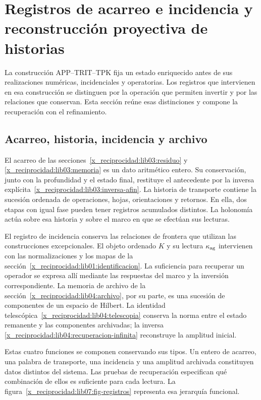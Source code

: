 \chapter{Registros de acarreo e incidencia y reconstrucción proyectiva de historias}
\label{x_reciprocidad:lib07:armonizacion}
La construcción APP--TRIT--TPK fija un estado enriquecido antes de
sus realizaciones numéricas, incidenciales y operatorias. Los registros
que intervienen en esa construcción se distinguen por la operación
que permiten invertir y por las relaciones que conservan. Esta sección
reúne esas distinciones y compone la recuperación con el refinamiento.

\section{Acarreo, historia, incidencia y archivo}
El acarreo de las secciones~\ref{x_reciprocidad:lib03:residuo} y
\ref{x_reciprocidad:lib03:memoria} es un dato aritmético entero. Su conservación,
junto con la profundidad y el estado final, restituye el antecedente
por la inversa explícita~\eqref{x_reciprocidad:lib03:inversa-afin}.
La historia de transporte contiene la sucesión ordenada de operaciones,
hojas, orientaciones y retornos. En ella, dos etapas con igual fase
pueden tener registros acumulados distintos. La holonomía actúa sobre
esa historia y sobre el marco en que se efectúan sus lecturas.

El registro de incidencia conserva las relaciones de frontera que
utilizan las construcciones excepcionales. El objeto ordenado \(K\)
y su lectura \(\kappa_{\rm ag}\) intervienen con las normalizaciones
y los mapas de la sección~\ref{x_reciprocidad:lib01:identificacion}.
La suficiencia para recuperar un operador se expresa allí mediante
las respuestas del marco y la inversión correspondiente.
La memoria de archivo de la sección~\ref{x_reciprocidad:lib04:archivo}, por su parte,
es una sucesión de componentes de un espacio de Hilbert. La identidad
telescópica~\eqref{x_reciprocidad:lib04:telescopia} conserva la norma entre el estado
remanente y las componentes archivadas; la inversa
\eqref{x_reciprocidad:lib04:recuperacion-infinita} reconstruye la amplitud inicial.

Estas cuatro funciones se componen conservando sus tipos.
Un entero de acarreo, una palabra de transporte, una incidencia
y una amplitud archivada constituyen datos distintos del sistema.
Las pruebas de recuperación especifican qué combinación de ellos
es suficiente para cada lectura. La figura~\ref{x_reciprocidad:lib07:fig-registros}
representa esa jerarquía funcional.


